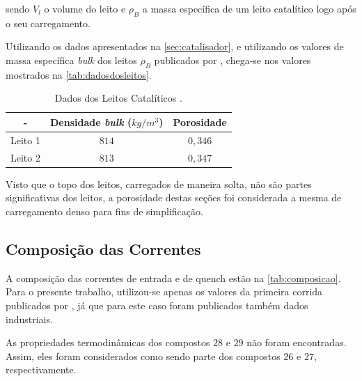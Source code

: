 sendo $V_l$ o volume do leito e $\rho_B$ a
massa específica de um leito catalítico logo após o seu carregamento. 

Utilizando os dados apresentados na \autoref{sec:catalisador}, e utilizando os
valores de massa específica \emph{bulk} dos leitos $\rho_{B}$ publicados por
, chega-se nos valores mostrados na
\autoref{tab:dadosdosleitos}.

\begin{table}[!htb]
\begin{center}
\caption{Dados dos Leitos Catalíticos \cite{Rojas2014a}.}
\label{tab:dadosdosleitos}
\small
\begin{tabular}{ccc}
{ - } & {Densidade \emph{bulk} ($kg/m^3$)} & {Porosidade} 
\\
\hline
{Leito 1} & $814$ & $0,346$ \\
{Leito 2} & $813$ & $0,347$ \\
\bottomrule
\end{tabular}
\end{center}
\end{table}

Visto que o topo dos leitos, carregados de maneira solta, não são partes
significativas dos leitos, a porosidade destas seções foi
considerada a mesma de carregamento denso para fins de simplificação. 

\subsection{Composição das Correntes} \label{sec:composicaocorrentes}

A composição das correntes de entrada e de quench estão na
\autoref{tab:composicao}. Para o presente trabalho, utilizou-se
apenas os valores da primeira corrida publicados por
, já que para este caso foram publicados
também dados industriais.

As propriedades termodinâmicas dos compostos $28$ e $29$ não foram
encontradas. Assim, eles foram considerados como sendo parte dos compostos
$26$ e $27$, respectivamente.

